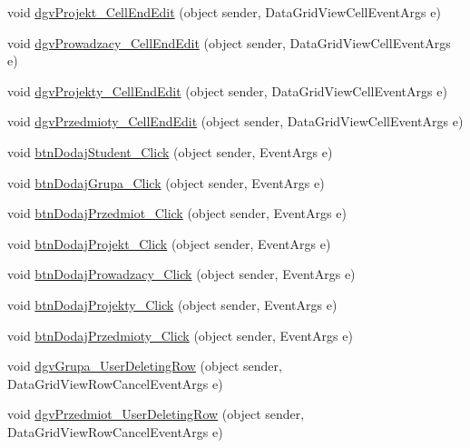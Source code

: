 \begin{DoxyCompactItemize}
\item 
void \hyperlink{class_dziennik_ocen_1_1_form_admin_a2f6a990aa7890c543a9b7d6cda212884}{dgv\+Projekt\+\_\+\+Cell\+End\+Edit} (object sender, Data\+Grid\+View\+Cell\+Event\+Args e)
\item 
void \hyperlink{class_dziennik_ocen_1_1_form_admin_a0b39905ac3fcb424c1d12975643712fa}{dgv\+Prowadzacy\+\_\+\+Cell\+End\+Edit} (object sender, Data\+Grid\+View\+Cell\+Event\+Args e)
\item 
void \hyperlink{class_dziennik_ocen_1_1_form_admin_a8041f9fec5afec151944bd5eeb7897c8}{dgv\+Projekty\+\_\+\+Cell\+End\+Edit} (object sender, Data\+Grid\+View\+Cell\+Event\+Args e)
\item 
void \hyperlink{class_dziennik_ocen_1_1_form_admin_ace196eca0cd55af280cb7e4a1a75a540}{dgv\+Przedmioty\+\_\+\+Cell\+End\+Edit} (object sender, Data\+Grid\+View\+Cell\+Event\+Args e)
\item 
void \hyperlink{class_dziennik_ocen_1_1_form_admin_a7633d40ff0076c9b931e533e24657801}{btn\+Dodaj\+Student\+\_\+\+Click} (object sender, Event\+Args e)
\item 
void \hyperlink{class_dziennik_ocen_1_1_form_admin_ac3dfb3b4fe0ed9e8a8f4dd8398e49823}{btn\+Dodaj\+Grupa\+\_\+\+Click} (object sender, Event\+Args e)
\item 
void \hyperlink{class_dziennik_ocen_1_1_form_admin_ad6d63eaff7b29753a359f638c130d54b}{btn\+Dodaj\+Przedmiot\+\_\+\+Click} (object sender, Event\+Args e)
\item 
void \hyperlink{class_dziennik_ocen_1_1_form_admin_a858b46657974fd92e0e4208dba8f4048}{btn\+Dodaj\+Projekt\+\_\+\+Click} (object sender, Event\+Args e)
\item 
void \hyperlink{class_dziennik_ocen_1_1_form_admin_a51a25d236307419c723310933f6a5440}{btn\+Dodaj\+Prowadzacy\+\_\+\+Click} (object sender, Event\+Args e)
\item 
void \hyperlink{class_dziennik_ocen_1_1_form_admin_a4f8a7e8bcbc364b7f2ca67d9bc306ab3}{btn\+Dodaj\+Projekty\+\_\+\+Click} (object sender, Event\+Args e)
\item 
void \hyperlink{class_dziennik_ocen_1_1_form_admin_a8931bc3365519fec70d38e714151f1ce}{btn\+Dodaj\+Przedmioty\+\_\+\+Click} (object sender, Event\+Args e)
\item 
void \hyperlink{class_dziennik_ocen_1_1_form_admin_a349ce3b1eeed9027c70615a77d250a5d}{dgv\+Grupa\+\_\+\+User\+Deleting\+Row} (object sender, Data\+Grid\+View\+Row\+Cancel\+Event\+Args e)
\item 
void \hyperlink{class_dziennik_ocen_1_1_form_admin_a5ff03e7113d930afdf9d0c651734fae0}{dgv\+Przedmiot\+\_\+\+User\+Deleting\+Row} (object sender, Data\+Grid\+View\+Row\+Cancel\+Event\+Args e)

\end{DoxyCompactItemize}
